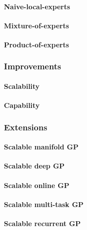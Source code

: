 \documentclass[10pt]{article}
\begin{document}
\paragraph{Naive-local-experts}

\paragraph{Mixture-of-experts}

\paragraph{Product-of-experts}


\subsubsection{Improvements}

\paragraph{Scalability}

\paragraph{Capability}


\subsubsection{Extensions}

\paragraph{Scalable manifold GP}

\paragraph{Scalable deep GP}

\paragraph{Scalable online GP}

\paragraph{Scalable multi-task GP}

\paragraph{Scalable recurrent GP}
\end{document}
